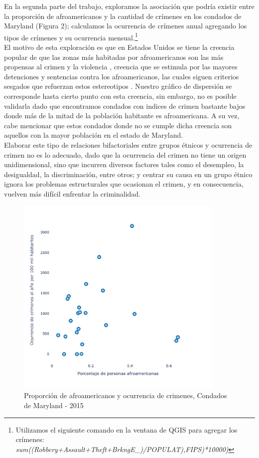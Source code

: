 \documentclass[11pt,a4paper]{article}
\begin{document}
En la segunda parte del trabajo, exploramos la asociación que podría existir entre la proporción de afroamericanos y la cantidad de crímenes en los condados de Maryland (Figura 2); calculamos la ocurrencia de crímenes anual agregando los tipos de crímenes y su ocurrencia mensual.\footnote{Utilizamos el siguiente comando en la ventana de QGIS para agregar los crímenes: \emph{sum((Robbery+Assault+Theft+BrkngE\_)/POPULAT),FIPS)*10000)}}
\\
El motivo de esta exploración es que en Estados Unidos se tiene la creencia popular de que las zonas más habitadas por afroamericanos son las más propensas al crimen y la violencia \cite{wolfgang_crime_1964}, creencia que se estimula por las mayores detenciones y sentencias contra los afroamericanos, las cuales siguen criterios sesgados que refuerzan estos estereotipos \cite{steffensmeier_ethnicity_2000,weitzer_race_2004}. Nuestro gráfico de dispersión se corresponde hasta cierto punto con esta creencia, sin embargo, no es posible validarla dado que encontramos condados con indices de crimen bastante bajos donde más de la mitad de la población habitante es afroamericana. A su vez, cabe mencionar que estos condados donde no se cumple dicha creencia son aquellos con la mayor población en el estado de Maryland.
\\
Elaborar este tipo de relaciones bifactoriales entre grupos étnicos y ocurrencia de crimen no es lo adecuado, dado que la ocurrencia del crimen no tiene un origen unidimensional, sino que incurren diversos factores tales como el desempleo, la desigualdad, la discriminación, entre otros; y centrar su causa en un grupo étnico ignora los problemas estructurales que ocasionan el crimen, y en consecuencia, vuelven más difícil enfrentar la criminalidad.

\begin{figure}[!h]
    \centering
    \includegraphics[width=10cm]{Graph/part2 graph1.png}
   \caption{Proporción de afroamericanos y ocurrencia de crimenes, Condados de Maryland - 2015}
    \label{fig:my_label}
\end{figure}

\clearpage
\printbibliography
\end{document}
